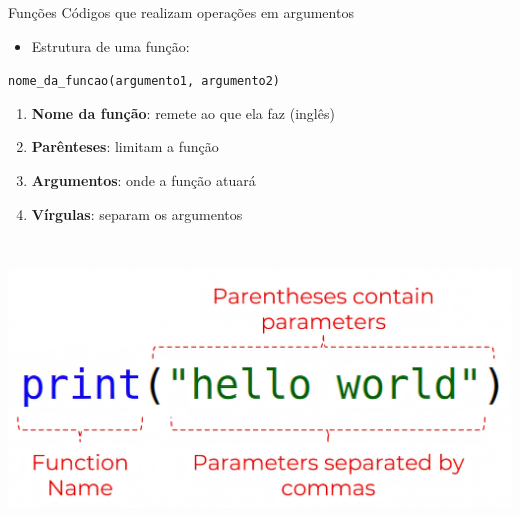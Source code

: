 \documentclass[
  ignorenonframetext,
]{beamer}
\providecommand{\tightlist}{%
  \setlength{\itemsep}{0pt}\setlength{\parskip}{0pt}}\usepackage{longtable,booktabs,array}
\begin{document}
\begin{frame}[fragile]{}
\begin{block}{Funções}
\protect\hypertarget{funuxe7uxf5es}{}
Códigos que realizam operações em argumentos

\begin{itemize}
\tightlist
\item
  Estrutura de uma função:
\end{itemize}

\texttt{nome\_da\_funcao(argumento1,\ argumento2)}

\begin{enumerate}
\tightlist
\item
  \textbf{Nome da função}: remete ao que ela faz (inglês)
\item
  \textbf{Parênteses}: limitam a função
\item
  \textbf{Argumentos}: onde a função atuará
\item
  \textbf{Vírgulas}: separam os argumentos
\end{enumerate}

\includegraphics[width=6.25in,height=3.125in]{img/code_function_annotated.png}
\end{block}
\end{frame}
\end{document}
